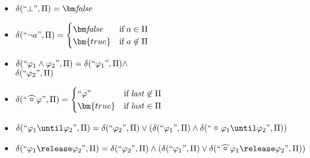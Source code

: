 \begin{definition}
\begin{multicols}{2}
\begin{itemize}
        \item $\delta(``\bot",\Pi)= \fpbf$
        

        \item $\delta(``\neg a",\Pi)=\begin{cases}
            \fpbf & \text{if} \;a\in \Pi \\
            \bm{true} & \text{if} \;a\not\in \Pi \\
          \end{cases}$

                  
        \item $\delta(``\varphi_1 \wedge \varphi_2",\Pi)=\delta(``\varphi_1",\Pi) \wedge $\\\phantom{$\delta(``\varphi_1 \wedge \varphi_2\;",\Pi)= $}$\delta(``\varphi_2",\Pi)$
        
        \item $\delta(``\wnext \varphi",\Pi)=\begin{cases}
            ``\varphi" & \text{if} \;\last\not\in \Pi \\
            \bm{true} & \text{if} \;\last\in \Pi \\
          \end{cases}$
      \end{itemize}
    \end{multicols}

    \begin{itemize}

        \item $\delta(``\varphi_1 \until \varphi_2",\Pi)=\delta(``\varphi_2",\Pi) \vee (\delta(``\varphi_1",\Pi) \wedge \delta(``\Next \varphi_1 \until \varphi_2",\Pi))$
    
        \item $\delta(``\varphi_1 \release \varphi_2",\Pi)=\delta(``\varphi_2",\Pi) \wedge (\delta(``\varphi_1",\Pi) \vee \delta(``\wnext \varphi_1 \release \varphi_2",\Pi))$
        



\end{itemize}
\end{definition}
